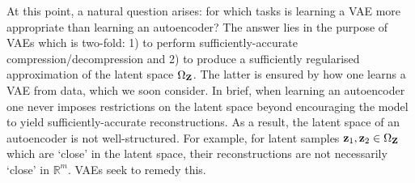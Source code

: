 \documentclass[11pt]{article}
\begin{document}
At this point, a natural question arises: for which tasks is learning a VAE more appropriate than learning an autoencoder? The answer lies in the purpose of VAEs which is two-fold: 1) to perform sufficiently-accurate compression/decompression and 2) to produce a sufficiently regularised approximation of the latent space $\Omega_{\mathbf{Z}}$. The latter is ensured by how one learns a VAE from data, which we soon consider. In brief, when learning an autoencoder one never imposes restrictions on the latent space beyond encouraging the model to yield sufficiently-accurate reconstructions. As a result, the latent space of an autoencoder is not well-structured. For example, for latent samples $\mathbf{z}_1,\mathbf{z}_2\in\Omega_{\mathbf{Z}}$ which are `close' in the latent space, their reconstructions are not necessarily `close' in $\mathbb{R}^m$. VAEs seek to remedy this.
\end{document}
